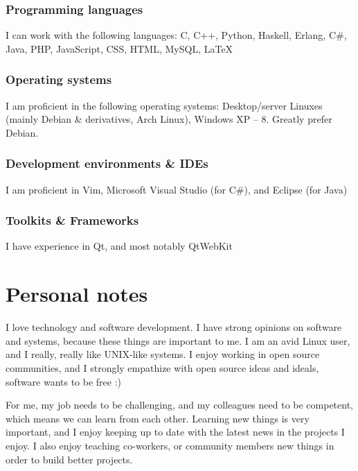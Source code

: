 \documentclass{twocolcv}
\begin{document}
\subsubsection*{Programming languages}
I can work with the following languages: C, C++, Python, Haskell, Erlang, C\#, Java, PHP, JavaScript, CSS, HTML, MySQL, \LaTeX
\subsubsection*{Operating systems}
I am proficient in the following operating systems: Desktop/server Linuxes (mainly Debian \& derivatives, Arch Linux), Windows XP -- 8. Greatly prefer Debian.
\subsubsection*{Development environments \& IDEs}
I am proficient in Vim, Microsoft Visual Studio (for C\#), and Eclipse (for Java)
\subsubsection*{Toolkits \& Frameworks}
I have experience in Qt, and most notably QtWebKit

\section*{Personal notes}
I love technology and software development. I have strong opinions on software and systems, because these things are important to me. I am an avid Linux user, and I really, really like UNIX-like systems. I enjoy working in open source communities, and I strongly empathize with open source ideas and ideals, software wants to be free :)

For me, my job needs to be challenging, and my colleagues need to be competent, which means we can learn from each other. Learning new things is very important, and I enjoy keeping up to date with the latest news in the projects I enjoy. I also enjoy teaching co-workers, or community members new things in order to build better projects.
\end{document}
